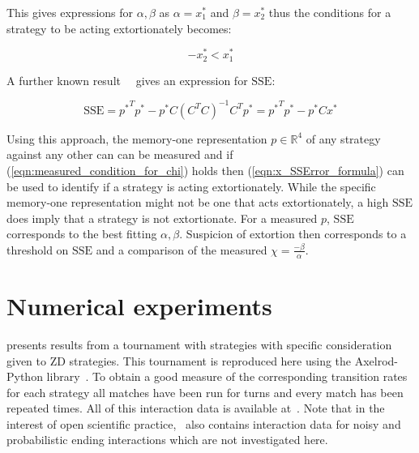 \documentclass[a4paper]{article}
\newcommand{\SSe}{\text{SSE}}
\begin{document}
This gives expressions for \(\alpha, \beta\) as \(\alpha=x^*_1\) and
\(\beta=x^*_2\) thus the conditions for a strategy to be acting extortionately
becomes:

\begin{equation}
    -x^*_2 < x^*_1 \label{eqn:measured_condition_for_chi}
\end{equation}

A further known result~~\cite{kutner2004applied, rao1973linear,
wakefield2013bayesian} gives an expression for
\(\SSe\):

\begin{equation}\label{eqn:x_SSError_formula}
    \SSe = {p ^ *} ^ T p ^ * -
           p ^ * C \left(C ^ T C \right) ^ {-1} C ^ T p ^ *
         = {p ^ *} ^ T p ^ * - p ^ * C x ^ *
\end{equation}

Using this approach, the memory-one representation \(p\in\mathbb{R}^4\) of any
strategy against any other can can be measured and if
(\ref{eqn:measured_condition_for_chi}) holds then (\ref{eqn:x_SSError_formula})
can be used to identify if a strategy is acting extortionately. While the
specific memory-one representation might not be one that acts extortionately, a
high \(\SSe\) does imply that a strategy is not extortionate. For a measured
\(p\), \(\SSe\) corresponds to the best fitting \(\alpha, \beta\). Suspicion of
extortion then corresponds to a threshold on \(\SSe\) and a comparison of the
measured \(\chi=\frac{-\beta}{\alpha}\).

\section{Numerical experiments}\label{sec:numerical-experiments}

\cite{Stewart2012} presents results from a tournament with
strategies
with specific consideration given to ZD strategies. This
tournament is reproduced here using the Axelrod-Python
library~\cite{Knight2016}. To obtain a good measure of the corresponding
transition rates for each strategy all matches have been run for
turns and every match has been
repeated times. All of this
interaction data is available at~\cite{vincent_knight_2018_1297075}. Note that
in the interest of open scientific practice,~\cite{vincent_knight_2018_1297075}
also contains interaction data for noisy and probabilistic ending interactions
which are not investigated here.
\end{document}
